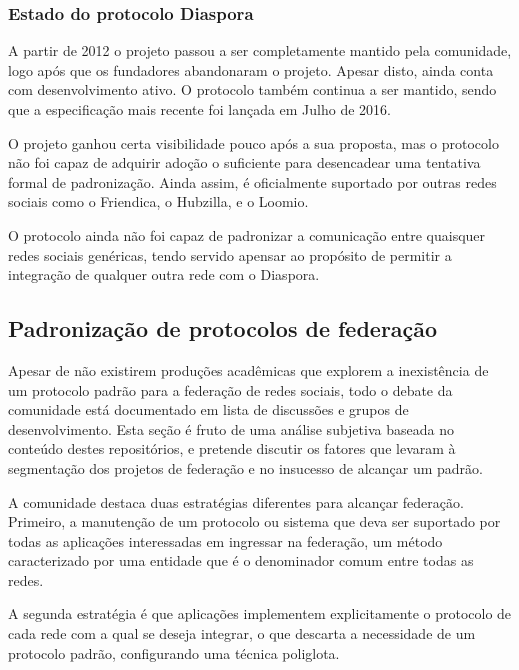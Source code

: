 \subsubsection{Estado do protocolo Diaspora}

A partir de 2012 o projeto passou a ser completamente mantido pela comunidade, logo
após que os fundadores abandonaram o projeto. Apesar disto, ainda conta com
desenvolvimento ativo. O protocolo também continua a ser mantido, sendo que a
especificação mais recente foi lançada em Julho de 2016.

O projeto ganhou certa visibilidade pouco após a sua proposta, mas o protocolo não
foi capaz de adquirir adoção o suficiente para desencadear uma tentativa formal de
padronização. Ainda assim, é oficialmente suportado por outras redes sociais como o
Friendica, o Hubzilla, e o Loomio.

O protocolo ainda não foi capaz de padronizar a comunicação entre quaisquer redes
sociais genéricas, tendo servido apensar ao propósito de permitir a integração
de qualquer outra rede com o Diaspora.


\subsection{Padronização de protocolos de federação}

Apesar de não existirem produções acadêmicas que explorem a inexistência de um
protocolo padrão para a federação de redes sociais, todo o debate da comunidade está
documentado em lista de discussões e grupos de desenvolvimento. Esta seção é fruto
de uma análise subjetiva baseada no conteúdo destes repositórios, e pretende
discutir os fatores que levaram à segmentação dos projetos de federação e no
insucesso de alcançar um padrão.



A comunidade destaca duas estratégias diferentes para alcançar federação. Primeiro,
a manutenção de um protocolo ou sistema que deva ser suportado por todas as
aplicações interessadas em ingressar na federação, um método caracterizado por uma
entidade que é o denominador comum entre todas as redes.

A segunda estratégia é que aplicações implementem explicitamente o protocolo de cada
rede com a qual se deseja integrar, o que descarta a necessidade de um protocolo
padrão, configurando uma técnica poliglota.

